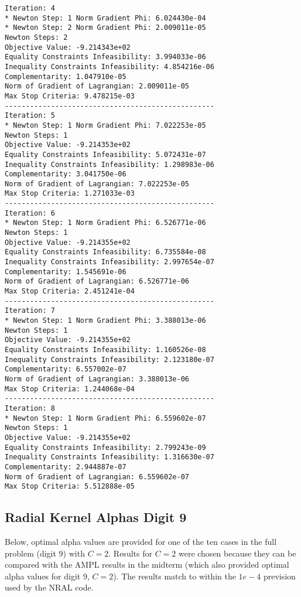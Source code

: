 \documentclass{article}
\begin{document}
\begin{minipage}[t]{0.45\textwidth}
\begin{verbatim}
Iteration: 4
* Newton Step: 1 Norm Gradient Phi: 6.024430e-04
* Newton Step: 2 Norm Gradient Phi: 2.009011e-05
Newton Steps: 2
Objective Value: -9.214343e+02
Equality Constraints Infeasibility: 3.994033e-06
Inequality Constraints Infeasibility: 4.854216e-06
Complementarity: 1.047910e-05
Norm of Gradient of Lagrangian: 2.009011e-05
Max Stop Criteria: 9.478215e-03
--------------------------------------------------
Iteration: 5
* Newton Step: 1 Norm Gradient Phi: 7.022253e-05
Newton Steps: 1
Objective Value: -9.214353e+02
Equality Constraints Infeasibility: 5.072431e-07
Inequality Constraints Infeasibility: 1.298983e-06
Complementarity: 3.041750e-06
Norm of Gradient of Lagrangian: 7.022253e-05
Max Stop Criteria: 1.271033e-03
--------------------------------------------------
Iteration: 6
* Newton Step: 1 Norm Gradient Phi: 6.526771e-06
Newton Steps: 1
Objective Value: -9.214355e+02
Equality Constraints Infeasibility: 6.735584e-08
Inequality Constraints Infeasibility: 2.997654e-07
Complementarity: 1.545691e-06
Norm of Gradient of Lagrangian: 6.526771e-06
Max Stop Criteria: 2.451241e-04
--------------------------------------------------
Iteration: 7
* Newton Step: 1 Norm Gradient Phi: 3.388013e-06
Newton Steps: 1
Objective Value: -9.214355e+02
Equality Constraints Infeasibility: 1.160526e-08
Inequality Constraints Infeasibility: 2.123180e-07
Complementarity: 6.557002e-07
Norm of Gradient of Lagrangian: 3.388013e-06
Max Stop Criteria: 1.244068e-04
--------------------------------------------------
Iteration: 8
* Newton Step: 1 Norm Gradient Phi: 6.559602e-07
Newton Steps: 1
Objective Value: -9.214355e+02
Equality Constraints Infeasibility: 2.799243e-09
Inequality Constraints Infeasibility: 1.316630e-07
Complementarity: 2.944887e-07
Norm of Gradient of Lagrangian: 6.559602e-07
Max Stop Criteria: 5.512888e-05
\end{verbatim}
\end{minipage}

\subsection{Radial Kernel Alphas Digit 9}\label{radiala9}

Below, optimal alpha values are provided for one of the ten cases in the full problem (digit 9) with \(C=2\). Results for \(C=2\) were chosen because they can be compared with the AMPL results in the midterm (which also provided optimal alpha values for digit 9, \(C=2\)). The results match to within the \(1e-4\) prevision used by the NRAL code.
\end{document}
